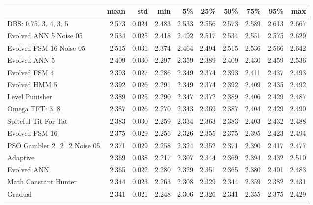\begin{tabular}{lrrrrrrrrr}
\toprule
{} &   mean &    std &    min &     5\% &    25\% &    50\% &    75\% &    95\% &    max \\
\midrule
DBS: 0.75, 3, 4, 3, 5      &  2.573 &  0.024 &  2.483 &  2.533 &  2.556 &  2.573 &  2.589 &  2.613 &  2.667 \\
Evolved ANN 5 Noise 05     &  2.534 &  0.025 &  2.418 &  2.492 &  2.517 &  2.534 &  2.551 &  2.575 &  2.629 \\
Evolved FSM 16 Noise 05    &  2.515 &  0.031 &  2.374 &  2.464 &  2.494 &  2.515 &  2.536 &  2.566 &  2.642 \\
Evolved ANN 5              &  2.409 &  0.030 &  2.297 &  2.359 &  2.389 &  2.409 &  2.430 &  2.459 &  2.536 \\
Evolved FSM 4              &  2.393 &  0.027 &  2.286 &  2.349 &  2.374 &  2.393 &  2.411 &  2.437 &  2.493 \\
Evolved HMM 5              &  2.392 &  0.026 &  2.291 &  2.349 &  2.374 &  2.392 &  2.409 &  2.435 &  2.492 \\
Level Punisher             &  2.389 &  0.025 &  2.290 &  2.347 &  2.372 &  2.389 &  2.406 &  2.429 &  2.487 \\
Omega TFT: 3, 8            &  2.387 &  0.026 &  2.270 &  2.343 &  2.369 &  2.387 &  2.404 &  2.429 &  2.490 \\
Spiteful Tit For Tat       &  2.383 &  0.030 &  2.259 &  2.334 &  2.363 &  2.383 &  2.403 &  2.432 &  2.488 \\
Evolved FSM 16             &  2.375 &  0.029 &  2.256 &  2.326 &  2.355 &  2.375 &  2.395 &  2.423 &  2.494 \\
PSO Gambler 2\_2\_2 Noise 05 &  2.371 &  0.029 &  2.258 &  2.324 &  2.352 &  2.371 &  2.390 &  2.417 &  2.477 \\
Adaptive                   &  2.369 &  0.038 &  2.217 &  2.307 &  2.344 &  2.369 &  2.394 &  2.432 &  2.510 \\
Evolved ANN                &  2.365 &  0.022 &  2.280 &  2.329 &  2.351 &  2.365 &  2.380 &  2.401 &  2.483 \\
Math Constant Hunter       &  2.344 &  0.023 &  2.263 &  2.308 &  2.329 &  2.344 &  2.359 &  2.382 &  2.431 \\
Gradual                    &  2.341 &  0.021 &  2.248 &  2.306 &  2.326 &  2.341 &  2.355 &  2.375 &  2.429 \\
\bottomrule
\end{tabular}
